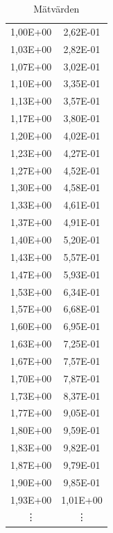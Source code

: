 \documentclass[11p, titlepage, oneside, a4paper]{article}
\begin{document}
\begin{table}
\begin{center}
\begin{tabular}{ |c|c| }
                1,00E+00 & 2,62E-01 \\
                1,03E+00 & 2,82E-01 \\
                1,07E+00 & 3,02E-01 \\
                1,10E+00 & 3,35E-01 \\
                1,13E+00 & 3,57E-01 \\
                1,17E+00 & 3,80E-01 \\
                1,20E+00 & 4,02E-01 \\
                1,23E+00 & 4,27E-01 \\
                1,27E+00 & 4,52E-01 \\
                1,30E+00 & 4,58E-01 \\
                1,33E+00 & 4,61E-01 \\
                1,37E+00 & 4,91E-01 \\
                1,40E+00 & 5,20E-01 \\
                1,43E+00 & 5,57E-01 \\
                1,47E+00 & 5,93E-01 \\
                1,53E+00 & 6,34E-01 \\
                1,57E+00 & 6,68E-01 \\
                1,60E+00 & 6,95E-01 \\
                1,63E+00 & 7,25E-01 \\
                1,67E+00 & 7,57E-01 \\
                1,70E+00 & 7,87E-01 \\
                1,73E+00 & 8,37E-01 \\
                1,77E+00 & 9,05E-01 \\
                1,80E+00 & 9,59E-01 \\
                1,83E+00 & 9,82E-01 \\
                1,87E+00 & 9,79E-01 \\
                1,90E+00 & 9,85E-01 \\
                1,93E+00 & 1,01E+00 \\

                \vdots & \vdots \\
                \hline
            \end{tabular}
                \caption{Mätvärden}
                \label{table:result}
            \end{center}
        \end{table}
\end{document}

